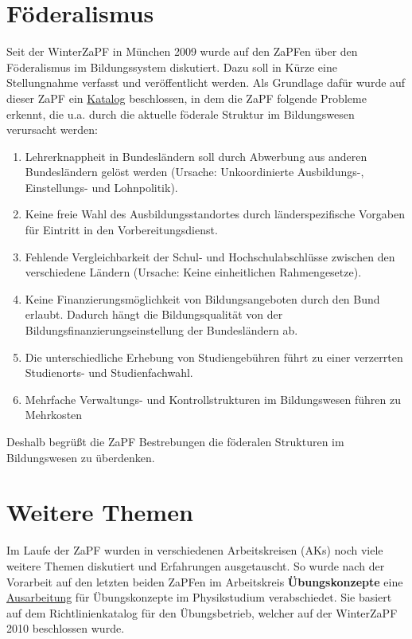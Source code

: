 \documentclass{scrartcl}
\begin{document}
\section*{Föderalismus}
\vspace{-12pt}
Seit der WinterZaPF in München 2009 wurde auf den ZaPFen über den Föderalismus im Bildungssystem
diskutiert. Dazu soll
in Kürze eine Stellungnahme verfasst und veröffentlicht werden. Als Grundlage dafür wurde auf dieser ZaPF ein
\href{http://zapfev.de/sites/default/files/2011_05_Katalog-Foederalismus.pdf}{Katalog} beschlossen, in dem die
ZaPF folgende Probleme erkennt, die u.a.
durch die aktuelle föderale Struktur im Bildungswesen verursacht werden:
\begin{enumerate}
 \item Lehrerknappheit in Bundesländern soll durch Abwerbung aus anderen Bundesländern gelöst werden (Ursache:
Unkoordinierte Ausbildungs-, Einstellungs- und Lohnpolitik).
 \item Keine freie Wahl des Ausbildungsstandortes durch länderspezifische Vorgaben für Eintritt in den
Vorbereitungsdienst.
 \item Fehlende Vergleichbarkeit der Schul- und Hochschulabschlüsse zwischen den verschiedene Ländern (Ursache: Keine
einheitlichen Rahmengesetze).
 \item Keine Finanzierungsmöglichkeit von Bildungsangeboten durch den Bund erlaubt. Dadurch hängt die Bildungsqualität
von der Bildungsfinanzierungseinstellung der Bundesländern ab.
 \item Die unterschiedliche Erhebung von Studiengebühren führt zu einer verzerrten Studien\-orts- und Studienfachwahl.
 \item Mehrfache Verwaltungs- und Kontrollstrukturen im Bildungswesen führen zu Mehrkosten
\end{enumerate}
Deshalb begrüßt die ZaPF Bestrebungen die föderalen Strukturen im Bildungswesen zu überdenken.

\section*{Weitere Themen}
\vspace{-12pt}
Im Laufe der ZaPF wurden in verschiedenen Arbeitskreisen (AKs) noch viele weitere Themen diskutiert und Erfahrungen
ausgetauscht. So wurde nach der Vorarbeit auf den letzten beiden ZaPFen im Arbeitskreis \textbf{Übungskonzepte}
eine \href{http://zapfev.de/sites/default/files/2011_05_Ausarbeitung_\%C3\%9Cbungskonzepte.pdf}{Ausarbeitung} für
Übungskonzepte im Physikstudium verabschiedet.
Sie basiert auf dem Richtlinienkatalog für den Übungsbetrieb, welcher auf der WinterZaPF 2010 beschlossen wurde.
\end{document}
